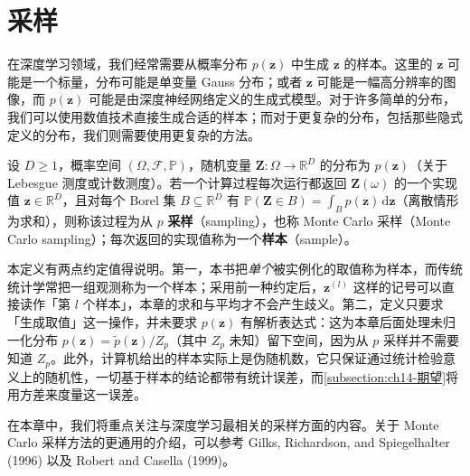 \documentclass[../main.tex]{subfiles}
\begin{document}
\chapter{采样}\label{chapter:ch14-采样}

在深度学习领域，我们经常需要从概率分布 $p(\bm{z})$ 中生成 $\bm{z}$ 的样本。这里的 $\bm{z}$ 可能是一个标量，分布可能是单变量 Gauss 分布；或者 $\bm{z}$ 可能是一幅高分辨率的图像，而 $p(\bm{z})$ 可能是由深度神经网络定义的生成式模型。对于许多简单的分布，我们可以使用数值技术直接生成合适的样本；而对于更复杂的分布，包括那些隐式定义的分布，我们则需要使用更复杂的方法。

\begin{definition}[采样与样本]\label{definition:ch14-采样}
设 $D\geqslant1$，概率空间 $(\Omega,\mathcal{F},\mathbb{P})$，随机变量 $\bm{Z}:\Omega\to\mathbb{R}^{D}$ 的分布为 $p(\bm{z})$（关于 Lebesgue 测度或计数测度）。若一个计算过程每次运行都返回 $\bm{Z}(\omega)$ 的一个实现值 $\bm{z}\in\mathbb{R}^{D}$，且对每个 Borel 集 $B\subseteq\mathbb{R}^{D}$ 有 $\mathbb{P}(\bm{Z}\in B)=\int_{B}p(\bm{z})\,\mathrm{d}\bm{z}$（离散情形为求和），则称该过程为从 $p$ \textbf{采样}（sampling），也称 Monte Carlo 采样（Monte Carlo sampling）；每次返回的实现值称为一个\textbf{样本}（sample）。
\end{definition}

\begin{remark}本定义有两点约定值得说明。第一，本书把\emph{单个}被实例化的取值称为样本，而传统统计学常把一组观测称为一个样本；采用前一种约定后，$\bm{z}^{(l)}$ 这样的记号可以直接读作「第 $l$ 个样本」，本章的求和与平均才不会产生歧义。第二，定义只要求「生成取值」这一操作，并未要求 $p(\bm{z})$ 有解析表达式：这为本章后面处理未归一化分布 $p(\bm{z})=\widetilde{p}(\bm{z})/Z_p$（其中 $Z_p$ 未知）留下空间，因为从 $p$ 采样并不需要知道 $Z_p$。此外，计算机给出的样本实际上是伪随机数，它只保证通过统计检验意义上的随机性，一切基于样本的结论都带有统计误差，而\cref{subsection:ch14-期望}将用方差来度量这一误差。
\end{remark}

在本章中，我们将重点关注与深度学习最相关的采样方面的内容。关于 Monte Carlo 采样方法的更通用的介绍，可以参考 Gilks, Richardson, and Spiegelhalter (1996) 以及 Robert and Casella (1999)。





\end{document}
